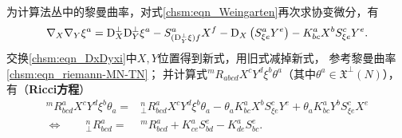 

为计算法丛中的黎曼曲率，对式\eqref{chsm:eqn_Weingarten}再次求协变微分，有
\begin{equation}\label{chsm:eqn_DxDyxi}
    {\nabla}_{X} {\nabla}_{Y} \xi^a
        =  {\rm D}_{X}^{\bot} {\rm D}_{Y}^{\bot} \xi^a - S^a_{({\rm D}_{Y}^{\bot} \xi) f} X^f
        - {\rm D}_{X} \left( S^a_{\xi e} Y^e  \right) - K^a_{bc}X^b S^c_{\xi e} Y^e .
\end{equation}
交换\eqref{chsm:eqn_DxDyxi}中$X,Y$位置得到新式，用旧式减掉新式，
参考黎曼曲率\eqref{chsm:eqn_riemann-MN-TN}；
并计算式${}^{m}{R}_{abcd} X^c Y^d \xi^b \theta^a$（其中$\theta^a\in \mathfrak{X}^\bot (N)$），
有（{\heiti \bfseries Ricci方程}）
\begin{subequations}\label{chsm:eqn_Ricci}
\begin{align}
    {}^{m}{R}^a_{bcd} X^c Y^d \xi^b \theta_a =& {}^{n}_{\bot}{R}^a_{bcd} X^c Y^d \xi^b \theta_a
        - \theta_a K^a_{bc}X^b S^c_{\xi e} Y^e   + \theta_a K^a_{bc}Y^b S^c_{\xi e} X^e
        \label{chsm:eqn_Ricci-a} \\    {\Leftrightarrow \qquad  }
    {}^{n}_{\bot}{R}^a_{bcd}  =& {}^{m}{R}^a_{bcd} + K^a_{ce} S^e_{b d} - K^a_{de} S^e_{b c}   .
      \label{chsm:eqn_Ricci-b}
\end{align}
\end{subequations}  %


